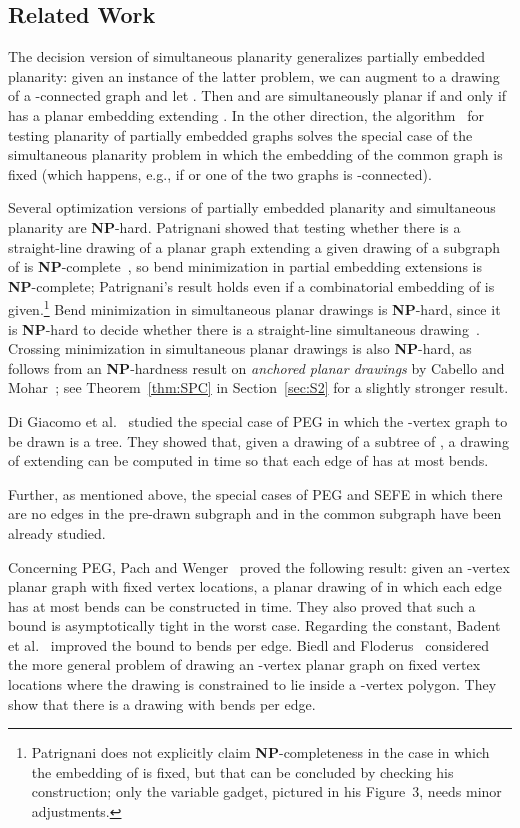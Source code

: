 \documentclass{llncs}
\newcommand{\NP}{\mbox{\bfseries NP}}
\begin{document}
\subsection{Related Work}

The decision version of simultaneous planarity generalizes partially embedded planarity: given an instance  of the latter problem, we can augment  to a drawing of a -connected graph  and let .  Then  and  are simultaneously planar if and only if  has a planar embedding extending . In the other direction, the algorithm~\cite{ABFJKPR10} for testing planarity of partially embedded graphs solves the special case of the simultaneous planarity problem in which the embedding of the common graph  is fixed (which happens, e.g., if  or one of the two graphs is -connected).

Several optimization versions of partially embedded planarity and simultaneous planarity are \NP-hard. Patrignani showed that testing whether there is a straight-line drawing of a planar graph  extending a given drawing of a subgraph of  is \NP-complete~\cite{P06}, so bend minimization in partial embedding extensions is \NP-complete; Patrignani's result holds  even if a combinatorial embedding of  is given.\footnote{Patrignani does not explicitly claim \NP-completeness in the case in which the embedding of  is fixed, but that can be concluded by checking his construction; only the variable gadget, pictured in his Figure~3, needs minor adjustments.}
Bend minimization in simultaneous planar drawings is \NP-hard, since it is \NP-hard to decide whether there is a straight-line simultaneous drawing~\cite{EGJPSS08}.
Crossing minimization in simultaneous planar drawings is also \NP-hard, as follows from an \NP-hardness result on \emph{anchored planar drawings} by Cabello and Mohar~\cite{Cabello-Mohar}; see Theorem~\ref{thm:SPC} in Section~\ref{sec:S2} for a slightly stronger result.

Di Giacomo et al.~\cite{ddlmw-psetgpd-09} studied the special case of PEG in which the -vertex graph  to be drawn is a tree. They showed that, given a drawing  of a subtree  of , a drawing of  extending  can be computed in  time so that each edge of  has at most  bends.

Further, as mentioned above, the special cases of PEG and SEFE in which there are no edges in the pre-drawn subgraph and in the common subgraph have been already studied.

Concerning PEG, Pach and Wenger~\cite{PW01} proved the following result: given an -vertex planar graph  with fixed vertex locations, a planar drawing of  in which each edge has at most  bends can be constructed in  time. They also proved that such a bound is asymptotically tight in the worst case.
Regarding the constant, Badent et al.~\cite{bgl-dcgcps-08} improved the bound to  bends per edge.
Biedl and Floderus~\cite{Biedl-Floderus} considered the more general problem of drawing an -vertex planar graph on fixed vertex locations where the drawing is constrained to lie inside a -vertex polygon.   They show that there is a drawing with  bends per edge.
\end{document}
